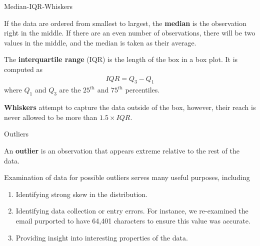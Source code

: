 \documentclass[12pt,a4paper]{beamer}
\begin{document}
\begin{frame}{Median-IQR-Whiskers}
\small\begin{framed}If the data are ordered from smallest to largest, the \textbf{median} is the observation right in the middle. If there are an even number of observations, there will be two values in the middle, and the median is taken as their average.
\end{framed}	
\small\begin{framed}
	The \textbf{interquartile range} (IQR) is the length of the box in a box plot. It is computed as
	\begin{eqnarray*}
	IQR = Q_3 - Q_1
	\end{eqnarray*}
	where $Q_1$ and $Q_3$ are the $25^{th}$ and $75^{th}$ percentiles.
\end{framed}
\begin{framed}
\textbf{Whiskers} attempt to capture the data outside of the box, however, their reach is never allowed to be more than  $1.5\times IQR$.
\end{framed}
\end{frame}
\begin{frame}{Outliers}
\begin{framed}
	An \textbf{outlier} is an observation that appears extreme relative to the rest of the data.
\end{framed}	
\begin{framed}
	Examination of data for possible outliers serves many useful purposes, including\vspace{-2mm}
	\begin{enumerate}
	\item Identifying strong skew in the distribution.
	\item Identifying data collection or entry errors. For instance, we re-examined the email purported to have 64,401 characters to ensure this value was accurate.
	\item Providing insight into interesting properties of the data.\vspace{0.5mm}
	\end{enumerate}
\end{framed}
\end{frame}
\end{document}
